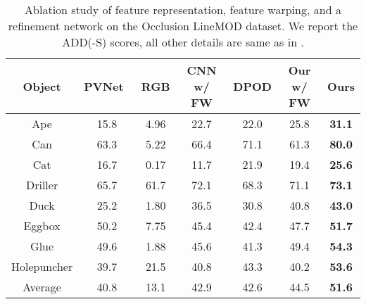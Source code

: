 \documentclass[10pt,twocolumn,letterpaper]{article}
\begin{document}
\begin{table}[t]
\small
\caption{Ablation study of feature representation, feature warping, and a refinement network on the Occlusion LineMOD dataset. We report the ADD(-S) scores, all other details are same as in .}
\centering
\scalebox{0.72} {
\begin{tabular}{c||c|ccc|cc}
  \hline
  Object     & PVNet~\cite{peng2019pvnet} & RGB & CNN w/ FW & DPOD & Our w/ FW & Ours \\ \hline
  Ape        & 15.8 & 4.96 & 22.7 & 22.0 & 25.8 & \textbf{31.1} \\
  Can        & 63.3 & 5.22 & 66.4 & 71.1 & 61.3 & \textbf{80.0} \\
  Cat        & 16.7 & 0.17 & 11.7 & 21.9 & 19.4 & \textbf{25.6} \\
  Driller    & 65.7 & 61.7 & 72.1 & 68.3 & 71.1 & \textbf{73.1} \\
  Duck       & 25.2 & 1.80 & 36.5 & 30.8 & 40.8 & \textbf{43.0} \\
  Eggbox     & 50.2 & 7.75 & 45.4 & 42.4 & 47.7 & \textbf{51.7} \\
  Glue       & 49.6 & 1.88 & 45.6 & 41.3 & 49.4 & \textbf{54.3} \\
  Holepuncher& 39.7 & 21.5 & 40.8 & 43.3 & 40.2 & \textbf{53.6} \\ \hline
  Average    & 40.8 & 13.1 & 42.9 & 42.6 & 44.5 & \textbf{51.6} \\ \hline
\end{tabular}
}
\label{tab:result_of_occlusion_linemod_ablation}
\end{table}
\end{document}
